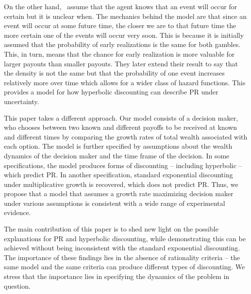 \documentclass[11pt]{article}
\numberwithin{equation}{section}
\begin{document}
On the other hand,~\citet{dasgupta2005uncertainty} assume that the agent knows that an event will occur for certain but it is unclear when. The mechanics behind the model are that since an event will occur at some future time, the closer we are to that future time the more certain one of the events will occur very soon. This is because it is initially assumed that the probability of early realizations is the same for both gambles. This, in turn, means that the chance for early realization is more valuable for larger payouts than smaller payouts. They later extend their result to say that the density is not the same but that the probability of one event increases relatively more over time which allows for a wider class of hazard functions. This provides a model for how hyperbolic discounting can describe PR under uncertainty.

This paper takes a different approach. Our model consists of a decision maker, who chooses between two known and different payoffs to be received at known and different times by comparing the growth rates of total wealth associated with each option. The model is further specified by assumptions about the wealth dynamics of the decision maker and the time frame of the decision. In some specifications, the model produces forms of discounting -- including hyperbolic -- which predict PR. In another specification, standard exponential discounting under multiplicative growth is recovered, which does not predict PR. Thus, we propose that a model that assumes a growth rate maximizing decision maker under various assumptions is consistent with a wide range of experimental evidence.


The main contribution of this paper is to shed new light on the possible explanations for PR and hyperbolic discounting, while demonstrating this can be achieved without being inconsistent with the standard exponential discounting. The importance of these findings lies in the absence of rationality criteria -- the same model and the same criteria can produce different types of discounting. We stress that the importance lies in specifying the dynamics of the problem in question.
\end{document}
